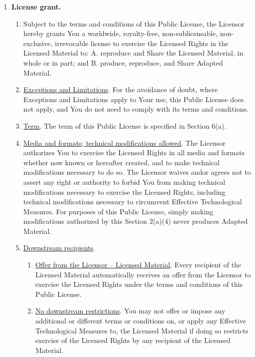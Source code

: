 \begin{enumerate}[label=\alph*.]
  \item \textbf{License grant.}
    \begin{enumerate}[label=\arabic*.]
      \item Subject to the terms and conditions of this Public License, the Licensor hereby grants You a worldwide, royalty-free, non-sublicensable, non-exclusive, irrevocable license to exercise the Licensed Rights in the Licensed Material to:
          A. reproduce and Share the Licensed Material, in whole or in part; and
          B. produce, reproduce, and Share Adapted Material.

      \item \underline{Exceptions and Limitations}. For the avoidance of doubt, where Exceptions and Limitations apply to Your use, this Public License does not apply, and You do not need to comply with its terms and conditions.

      \item \underline{Term}. The term of this Public License is specified in Section 6(a).

      \item \underline{Media and formats; technical modifications allowed}. The Licensor authorizes You to exercise the Licensed Rights in all media and formats whether now known or hereafter created, and to make technical modifications necessary to do so. The Licensor waives and\myslash or agrees not to assert any right or authority to forbid You from making technical modifications necessary to exercise the Licensed Rights, including technical modifications necessary to circumvent Effective Technological Measures. For purposes of this Public License, simply making modifications authorized by this Section 2(a)(4) never produces Adapted Material.

      \item \underline{Downstream recipients}.

        \begin{enumerate}[label=\Alph*.]
          \item \underline{Offer from the Licensor – Licensed Material}. Every recipient of the Licensed Material automatically receives an offer from the Licensor to exercise the Licensed Rights under the terms and conditions of this Public License.

          \item \underline{No downstream restrictions}. You may not offer or impose any additional or different terms or conditions on, or apply any Effective Technological Measures to, the Licensed Material if doing so restricts exercise of the Licensed Rights by any recipient of the Licensed Material.
        \end{enumerate}


\end{enumerate}
\end{enumerate}
